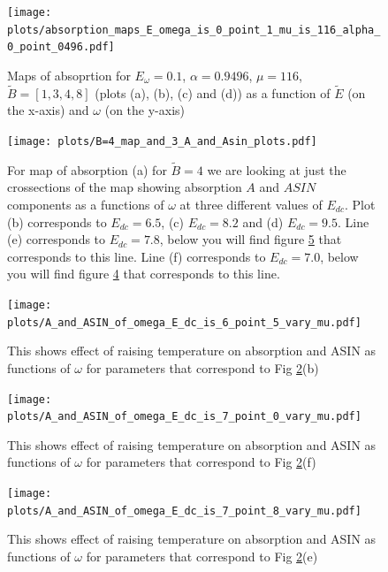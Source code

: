 \documentclass[40pt,letterpaper,physrev]{article}
\begin{document}
	\newpage	
	\begin{figure}[t]
	  \centering
	  \normalsize %
	  \texttt{[image: plots/absorption\_maps\_E\_omega\_is\_0\_point\_1\_mu\_is\_116\_alpha\_0\_point\_0496.pdf]}
	  \caption{Maps of absoprtion for $E_\omega=0.1$, $\alpha=0.9496$, $\mu=116$, $\tilde{B}=[1,3,4,8]$ 
	  (plots (a), (b), (c) and (d)) as a function of $\tilde{E}$ (on the x-axis) and $\omega$ (on the y-axis)}
	  \label{fig:absorption}	  
	\end{figure}	
	\begin{figure}[H]
	  \centering
	  \normalsize %
	  \texttt{[image: plots/B=4\_map\_and\_3\_A\_and\_Asin\_plots.pdf]}
	  \caption{For map of absorption (a) for $\tilde{B}=4$ we are looking at just the crossections of the
	  map showing absorption $A$ and $ASIN$ components as a functions of $\omega$ at three different values of $E_{dc}$.
	  Plot (b) corresponds to $E_{dc}=6.5$, (c) $E_{dc}=8.2$ and (d) $E_{dc}=9.5$. Line (e) corresponds to $E_{dc}=7.8$, 
	  below you will find figure \ref{fig:E_dc=7.8_B=4_different_mu} that corresponds to this line. Line (f) 
	  corresponds to $E_{dc}=7.0$, below you will find figure \ref{fig:E_dc=7.0_B=4_different_mu} that corresponds to this line.}
	  \label{fig:map_of_absorption_and_profiles_for_three_different_E_dc_B=4}
	\end{figure}	
	\newpage	
	\begin{figure}[t]
	  \centering
	  \normalsize %
	  \texttt{[image: plots/A\_and\_ASIN\_of\_omega\_E\_dc\_is\_6\_point\_5\_vary\_mu.pdf]}
	  \caption{This shows effect of raising temperature on absorption and ASIN as functions of $\omega$ for parameters that 
	  correspond to Fig \ref{fig:map_of_absorption_and_profiles_for_three_different_E_dc_B=4}(b)}
	  \label{fig:E_dc=6.5_B=4_different_mu}	  
	\end{figure}
	\begin{figure}[H]
	  \centering
	  \normalsize %
	  \texttt{[image: plots/A\_and\_ASIN\_of\_omega\_E\_dc\_is\_7\_point\_0\_vary\_mu.pdf]}
	  \caption{This shows effect of raising temperature on absorption and ASIN as functions of $\omega$ for parameters that 
	  correspond to Fig \ref{fig:map_of_absorption_and_profiles_for_three_different_E_dc_B=4}(f)}
	  \label{fig:E_dc=7.0_B=4_different_mu}	  
	\end{figure}
	\newpage
	\begin{figure}[t]
	  \centering
	  \normalsize %
	  \texttt{[image: plots/A\_and\_ASIN\_of\_omega\_E\_dc\_is\_7\_point\_8\_vary\_mu.pdf]}
	  \caption{This shows effect of raising temperature on absorption and ASIN as functions of $\omega$ for parameters that 
	  correspond to Fig \ref{fig:map_of_absorption_and_profiles_for_three_different_E_dc_B=4}(e)}
	  \label{fig:E_dc=7.8_B=4_different_mu}	  
	\end{figure}
\end{document}
